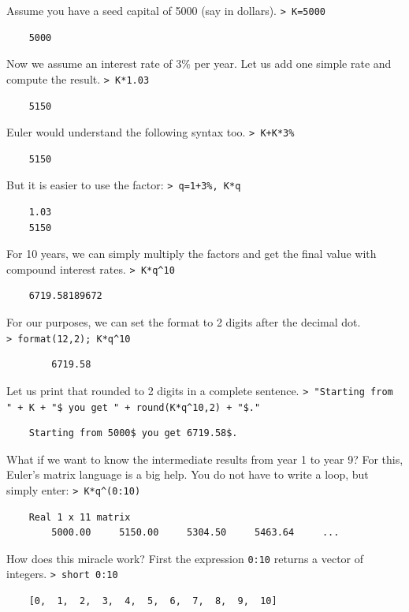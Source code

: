 \documentclass[11pt, a4paper]{article}
\newcommand{\emtcmd}[1]{\noindent\texttt{\textcolor{emtcommand}{>}\ #1}\par\smallskip}
\begin{document}
Assume you have a seed capital of 5000 (say in dollars).
\emtcmd{K=5000}
\begin{verbatim}
    5000
\end{verbatim}

Now we assume an interest rate of $3\%$ per year. Let us add one simple rate and compute the result.
\emtcmd{K*1.03}
\begin{verbatim}
    5150
\end{verbatim}

Euler would understand the following syntax too.
\emtcmd{K+K*3\%}
\begin{verbatim}
    5150
\end{verbatim}

But it is easier to use the factor:
\emtcmd{q=1+3\%, K*q}
\begin{verbatim}
    1.03
    5150
\end{verbatim}

For 10 years, we can simply multiply the factors and get the final value with compound interest rates.
\emtcmd{K*q\^{}10}
\begin{verbatim}
    6719.58189672
\end{verbatim}

For our purposes, we can set the format to 2 digits after the decimal dot.
\emtcmd{format(12,2); K*q\^{}10}
\begin{verbatim}
        6719.58
\end{verbatim}

Let us print that rounded to 2 digits in a complete sentence.
\emtcmd{"Starting from " + K + "\$ you get " + round(K*q\^{}10,2) + "\$."}
\begin{verbatim}
    Starting from 5000$ you get 6719.58$.
\end{verbatim}

What if we want to know the intermediate results from year 1 to year 9? For this, Euler's matrix language is a big help. You do not have to write a loop, but simply enter:
\emtcmd{K*q\^{}(0:10)}
\begin{verbatim}
    Real 1 x 11 matrix
        5000.00     5150.00     5304.50     5463.64     ...
\end{verbatim}

How does this miracle work? First the expression \texttt{0:10} returns a vector of integers.
\emtcmd{short 0:10}
\begin{verbatim}
    [0,  1,  2,  3,  4,  5,  6,  7,  8,  9,  10]
\end{verbatim}
\end{document}
